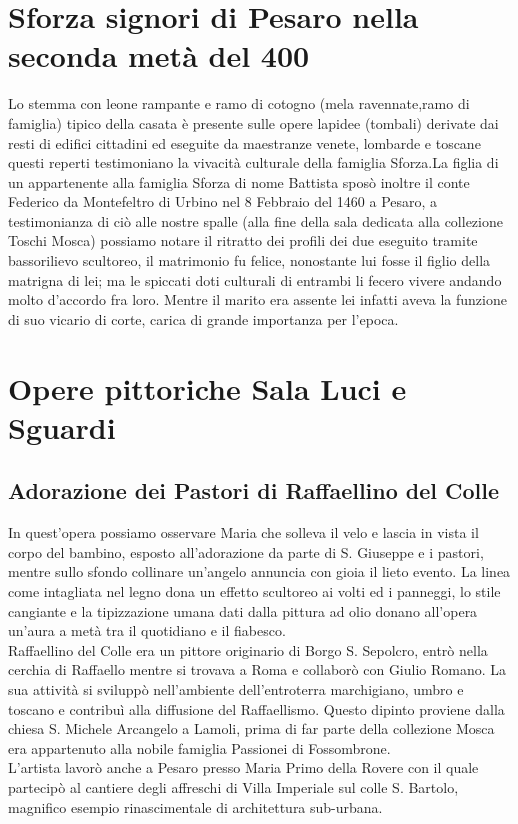 \documentclass[hidelinks,12pt,a4paper]{article}
\begin{document}
\begin{flushleft}
			\section{Sforza signori di Pesaro nella seconda metà del 400}
			Lo stemma con leone rampante e ramo di cotogno (mela ravennate,ramo di famiglia) tipico della casata è presente sulle opere lapidee (tombali) derivate dai resti di edifici cittadini ed eseguite da maestranze venete, lombarde e toscane questi reperti testimoniano la vivacità culturale della famiglia Sforza.La figlia di un appartenente alla famiglia Sforza di nome Battista sposò inoltre il conte Federico da Montefeltro di Urbino nel 8 Febbraio del 1460 a Pesaro, a testimonianza di ciò alle nostre spalle (alla fine della sala dedicata alla collezione Toschi Mosca) possiamo notare il ritratto dei profili dei due eseguito tramite bassorilievo scultoreo, il matrimonio fu felice, nonostante lui fosse il figlio della matrigna di lei; ma le spiccati doti culturali di entrambi li fecero vivere andando molto d'accordo fra loro. Mentre il marito era assente lei infatti aveva la funzione di suo vicario di corte, carica di grande importanza per l'epoca.
	
			\section{Opere pittoriche Sala Luci e Sguardi} 
	
			\subsection{Adorazione dei Pastori di Raffaellino del Colle}
			In quest'opera possiamo osservare Maria che solleva il velo e lascia in vista il corpo del bambino, esposto all'adorazione da parte di S. Giuseppe e i pastori, mentre sullo sfondo collinare un'angelo annuncia con gioia il lieto evento.
			La linea come intagliata nel legno dona un effetto scultoreo ai volti ed i panneggi, lo stile cangiante e la tipizzazione umana dati dalla pittura ad olio donano all'opera un'aura a metà tra il quotidiano e il fiabesco.\\
			Raffaellino del Colle era un pittore originario di Borgo S. Sepolcro, entrò nella cerchia di Raffaello mentre si trovava a Roma e collaborò con Giulio Romano. La sua attività si sviluppò nell'ambiente dell'entroterra marchigiano, umbro e toscano e contribuì alla diffusione del Raffaellismo. Questo dipinto proviene dalla chiesa S. Michele Arcangelo a Lamoli, prima di far parte della collezione Mosca era appartenuto alla nobile famiglia Passionei di Fossombrone.\\
			L'artista lavorò anche a Pesaro presso Maria Primo della Rovere con il quale partecipò al cantiere degli affreschi di Villa Imperiale sul colle S. Bartolo, magnifico esempio rinascimentale di architettura sub-urbana.
	

\end{flushleft}
\end{document}
